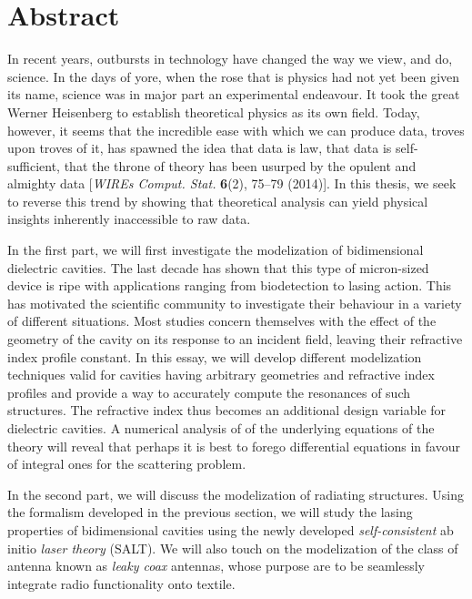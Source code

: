 \chapter*{Abstract}

In recent years, outbursts in technology have changed the way 
we view, and do, science. In the days of yore, when the rose
that is physics had not yet been given its name, science
was in major part an experimental endeavour. It took the great
Werner Heisenberg to establish theoretical physics as its own field. 
Today, however, it seems that the incredible ease with which we 
can produce data, troves upon troves of it, has spawned the idea
that data is law, that data is self-sufficient, that the throne of 
theory has been usurped by the opulent and almighty data 
[\textit{WIREs Comput. Stat.} \textbf{6}(2), 75--79 (2014)]. In this
thesis, we seek to reverse this trend by showing that theoretical 
analysis can yield physical insights inherently inaccessible to
raw data. 

In the first part, we will first investigate the modelization of bidimensional dielectric
cavities. The last decade has shown that this type of micron-sized device
is ripe with applications ranging from biodetection to lasing action. 
This has motivated the scientific community to investigate their behaviour in a
variety of different situations. Most studies concern themselves with the effect
of the geometry of the cavity on its response to an incident field, leaving their refractive index
profile constant. In this essay, we will develop different modelization techniques valid 
for cavities having arbitrary geometries and refractive index profiles and provide
a way to accurately compute the resonances of such structures. The refractive
index thus becomes an additional design variable for dielectric cavities.
A numerical analysis of of the underlying equations of the theory will
reveal that perhaps it is best to forego differential equations 
in favour of integral ones for the scattering problem. 

In the second part, we will discuss the modelization of radiating structures. 
Using the formalism developed in the previous section, we will study the 
lasing properties of bidimensional cavities using the newly developed
\textit{self-consistent} ab initio \textit{laser theory} (SALT). We will also
touch on the modelization of the class of antenna known as \textit{leaky coax} antennas, 
whose purpose are to be seamlessly integrate radio functionality onto textile.